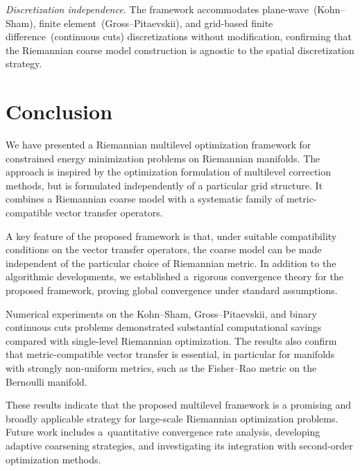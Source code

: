 \documentclass[11pt,reqno]{amsart}
\theoremstyle{plain}
\begin{document}
		\textit{Discretization independence.} The framework accommodates plane-wave~(Kohn--Sham), finite element~(Gross--Pitaevskii), and grid-based finite difference~(continuous cuts) discretizations without modification, confirming that the Riemannian coarse model construction is agnostic to the spatial discretization strategy.
		
		\section{Conclusion}
		\label{sec:conclusion}
		
		We have presented a Riemannian multilevel optimization framework for constrained energy minimization problems on Riemannian manifolds. The approach is inspired by the optimization formulation of multilevel correction methods, but is formulated independently of a particular grid structure. It combines a Riemannian coarse model with a systematic family of metric-compatible vector transfer operators.
		
		A key feature of the proposed framework is that, under suitable compatibility conditions on the vector transfer operators, the coarse model can be made independent of the particular choice of Riemannian metric. In addition to the algorithmic developments, we established a~rigorous convergence theory for the proposed framework, proving global convergence under standard assumptions.
		
		Numerical experiments on the Kohn--Sham, Gross--Pitaevskii, and binary continuous cuts problems demonstrated substantial computational savings compared with single-level Riemannian optimization. The results also confirm that metric-compatible vector transfer is essential, in particular for manifolds with strongly non-uniform metrics, such as the Fisher--Rao metric on the Bernoulli manifold.
		
		These results indicate that the proposed multilevel framework is a promising and broadly applicable strategy for large-scale Riemannian optimization problems. Future work includes a~quantitative convergence rate analysis, developing adaptive coarsening strategies, and investigating its integration with second-order optimization methods.
		
		
		\printbibliography
		
	
\end{document}
